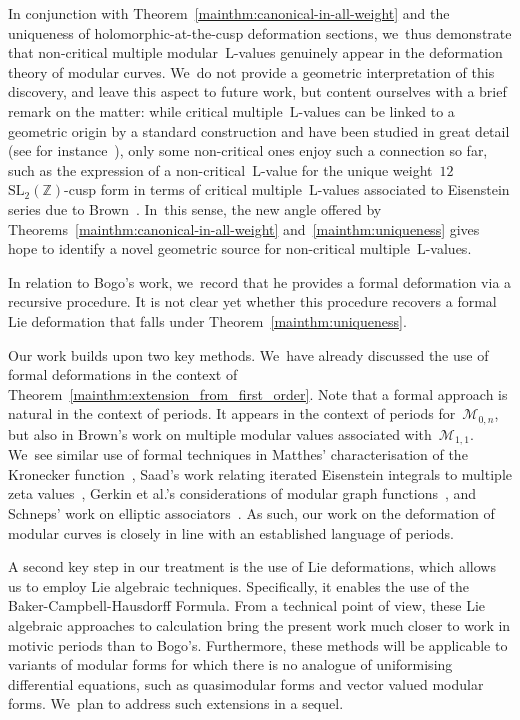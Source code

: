 \documentclass[JEP,XML,SOM,Unicode,published]{cedram}
\theoremstyle{plain}
\theoremstyle{definition}
\newcommand{\nbd}{\nobreakdash-\hspace{0pt}}
\newcommand{\bbZ}{\ensuremath{\mathbb{Z}}}
\newcommand{\cM}{\ensuremath{\mathcal{M}}}
\newcommand{\rmL}{\ensuremath{\mathrm{L}}}
\newcommand{\SL}[1]{\ensuremath{\mathrm{SL}_{#1}}}
\begin{document}
In conjunction with Theorem~\ref{mainthm:canonical-in-all-weight} and the uniqueness of holomorphic-at-the-cusp deformation sections, we~thus demonstrate that non-critical multiple modular~$\rmL$\nbd{}values genuinely appear in the deformation theory of modular curves. We~do not provide a geometric interpretation of this discovery, and leave this aspect to future work, but content ourselves with a brief remark on the matter: while critical multiple~$\rmL$\nbd{}values can be linked to a geometric origin by a standard construction and have been studied in great detail (see for instance~\cite{brown17,dorigonietal2024}), only some non-critical ones enjoy such a connection so far, such as the expression of a non-critical~$\rmL$\nbd{}value for the unique weight~$12$ $\SL{2}(\bbZ)$\nbd{}cusp form in terms of critical multiple~$\rmL$\nbd{}values associated to Eisenstein series due to Brown~\cite{brown17}. In~this sense, the new angle offered by Theorems~\ref{mainthm:canonical-in-all-weight} and~\ref{mainthm:uniqueness} gives hope to identify a novel geometric source for non-critical multiple~$\rmL$\nbd{}values.

In relation to Bogo's work, we~record that he provides a formal deformation via a recursive procedure. It is not clear yet whether this procedure recovers a formal Lie deformation that falls under Theorem~\ref{mainthm:uniqueness}.

Our work builds upon two key methods. We~have already discussed the use of formal deformations in the context of Theorem~\ref{mainthm:extension_from_first_order}. Note that a formal approach is natural in the context of periods. It appears in the context of periods for~$\cM_{0,n}$, but also in Brown's work on multiple modular values associated with~$\cM_{1,1}$. We~see similar use of formal techniques in Matthes' characterisation of the Kronecker function~\cite{matthes19}, Saad's work relating iterated Eisenstein integrals to multiple zeta values~\cite{saad20}, Gerkin et al.'s considerations of modular graph functions~\cite{gerken20}, and Schneps' work on elliptic associators~\cite{schneps23}. As such, our work on the deformation of modular curves is closely in line with an established language of periods.

A second key step in our treatment is the use of Lie deformations, which allows us to employ Lie algebraic techniques. Specifically, it enables the use of the Baker-Campbell-Hausdorff Formula. From a technical point of view, these Lie algebraic approaches to calculation bring the present work much closer to work in motivic periods than to Bogo's. Furthermore, these methods will be applicable to variants of modular forms for which there is no analogue of uniformising differential equations, such as quasimodular forms and vector valued modular forms. We~plan to address such extensions in a sequel.
\end{document}
